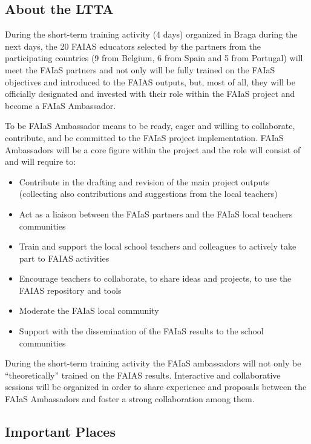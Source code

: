 \documentclass[11pt]{article}
\begin{document}
\subsection*{About the LTTA}

During the short-term training activity (4 days) organized in Braga during the next days, the 20 FAIAS educators selected by the partners from the participating countries (9 from Belgium, 6 from Spain and 5 from Portugal) will meet the FAIaS partners and not only will be fully trained on the FAIaS objectives and introduced to the FAIAS outputs, but, most of all, they will be officially designated and invested with their role within the FAIaS project and become a FAIaS Ambassador.

To be FAIaS Ambassador means to be ready, eager and willing to collaborate, contribute, and be committed to the FAIaS project implementation. FAIaS Ambassadors will be a core figure within the project and the role will consist of and will require to:
\begin{itemize}
    \item Contribute in the drafting and revision of the main project outputs (collecting also contributions and suggestions from the local teachers)
    \item Act as a liaison between the FAIaS partners and the FAIaS local teachers communities 
    \item Train and support the local school teachers and colleagues to actively take part to FAIAS activities
    \item Encourage teachers to collaborate, to share ideas and projects, to use the FAIAS repository and tools 
    \item Moderate the FAIaS local community 
    \item Support with the dissemination of the FAIaS results to the school communities
\end{itemize}

During the short-term training activity the FAIaS ambassadors will not only be “theoretically” trained on the FAIAS results. Interactive and collaborative sessions will be organized in order to share experience and proposals between the FAIaS Ambassadors and foster a strong collaboration among them.

\subsection*{Important Places}
\end{document}
